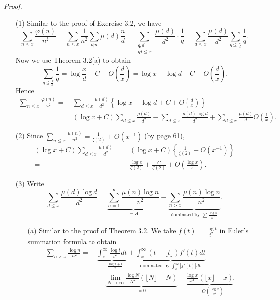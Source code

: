 \documentclass{article}
\begin{document}
\emph{Proof.}
\begin{enumerate}
\item[(1)]
  Similar to the proof of Exercise 3.2, we have
  \[
    \sum_{n \leq x} \frac{\varphi(n)}{n^2}
    = \sum_{n \leq x} \frac{1}{n^2} \sum_{d|n} \mu(d) \frac{n}{d}
    = \sum_{\substack{q,d \\ qd \leq x}} \frac{\mu(d)}{d^2} \cdot \frac{1}{q}
    = \sum_{d \leq x} \frac{\mu(d)}{d^2} \sum_{q \leq \frac{x}{d}} \frac{1}{q}.
  \]
  Now we use Theorem 3.2(a) to obtain
  \[
    \sum_{q \leq \frac{x}{d}} \frac{1}{q}
    = \log\frac{x}{d} + C + O\left(\frac{d}{x}\right)
    = \log x - \log d + C + O\left(\frac{d}{x}\right).
  \]
  Hence
  \begin{align*}
    \sum_{n \leq x} \frac{\varphi(n)}{n^2}
    =& \: \sum_{d \leq x}
        \frac{\mu(d)}{d^2} \left\{ \log x - \log d + C + O\left(\frac{d}{x}\right) \right\} \\
    =& \: (\log x + C) \sum_{d \leq x} \frac{\mu(d)}{d^2}
        - \sum_{d \leq x} \frac{\mu(d) \log d}{d^2}
        + \sum_{d \leq x} \frac{\mu(d)}{d} O\left(\frac{1}{x}\right).
  \end{align*}

\item[(2)]
  Since $\sum_{n \leq x} \frac{\mu(n)}{n^2} = \frac{1}{\zeta(2)} + O(x^{-1})$ (by page 61),
  \begin{align*}
    (\log x + C) \sum_{d \leq x} \frac{\mu(d)}{d^2}
    =& \: (\log x + C)\left\{ \frac{1}{\zeta(2)} + O(x^{-1}) \right\} \\
    =& \: \frac{\log x}{\zeta(2)} + \frac{C}{\zeta(2)}
        + O\left( \frac{\log x}{x} \right).
  \end{align*}

\item[(3)]
  Write
  \[
    \sum_{d \leq x} \frac{\mu(d) \log d}{d^2}
    = \underbrace{\sum_{n=1}^{\infty} \frac{\mu(n) \log n}{n^2}}_{= A}
        - \underbrace{\sum_{n > x} \frac{\mu(n) \log n}{n^2}}_{
            \text{dominated by $\sum \frac{\log n}{n^2}$}}.
  \]
  \begin{enumerate}
    \item[(a)]
    Similar to the proof of Theorem 3.2.
    We take $f(t) = \frac{\log t}{t^2}$ in Euler's summation formula to obtain
    \begin{align*}
      \sum_{n > x} \frac{\log n}{n^2}
      = & \: \underbrace{\int_{x}^{\infty} \frac{\log t}{t^2} dt}_{
          = \frac{\log x + 1}{x}}
          + \underbrace{\int_{x}^{\infty} (t-\lfloor t \rfloor) f'(t) dt}_{
              \text{dominated by $\int_{x}^{\infty} |f'(t)| dt$}} \\
        & \: + \underbrace{\lim_{N \to \infty} \frac{\log N}{N^2}(\lfloor N \rfloor - N)}_{= 0}
            - \underbrace{\frac{\log x}{x^2}(\lfloor x \rfloor - x)}_{
                = O\left( \frac{\log x}{x^2} \right)}.
    \end{align*}


\end{enumerate}
\end{enumerate}
\end{document}
